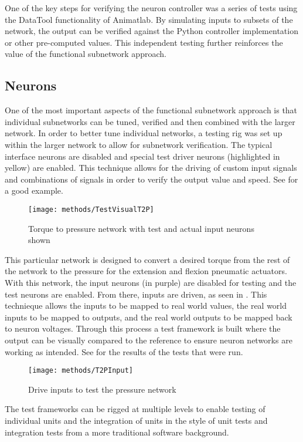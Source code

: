 One of the key steps for verifying the neuron controller was a series of tests
using the DataTool functionality of Animatlab. By simulating inputs to subsets
of the network, the output can be verified against the Python controller
implementation or other pre-computed values. This independent testing further
reinforces the value of the functional subnetwork approach.

\subsection{Neurons}

One of the most important aspects of the functional subnetwork approach is that
individual subnetworks can be tuned, verified and then combined with the larger
network. In order to better tune individual networks, a testing rig was set up
within the larger network to allow for subnetwork verification. The typical
interface neurons are disabled and special test driver neurons (highlighted in
yellow) are enabled. This technique allows for the driving of custom input signals and
combinations of signals in order to verify the output value and speed. 
See  for a good example.

\begin{figure}
\centering
\texttt{[image: methods/TestVisualT2P]}
\caption{Torque to pressure network with test and actual input neurons shown}
\label{fig:TestNetworkT2P}
\end{figure}

This particular network is designed to convert a desired torque from the rest
of the network to the pressure for the extension and flexion pneumatic actuators.
With this network, the input neurons (in purple)
are disabled for testing and the test neurons are enabled. From there, inputs
are driven, as seen in . This technieque allows the inputs to 
be mapped to real world values, the real world inputs to be mapped to outputs, 
and the real world outputs to be mapped back to neuron voltages. Through this
process a test framework is built where the output can be visually compared to the 
reference to ensure neuron networks are working as intended. See 
 for the results of the tests that were run.

\begin{figure}
\centering
\texttt{[image: methods/T2PInput]}
\caption{Drive inputs to test the pressure network}
\label{fig:TestNetworkInputs}
\end{figure}

The test frameworks can be rigged at multiple levels to enable testing of
individual units and the integration of units in the style of unit tests and
integration tests from a more traditional software background.
